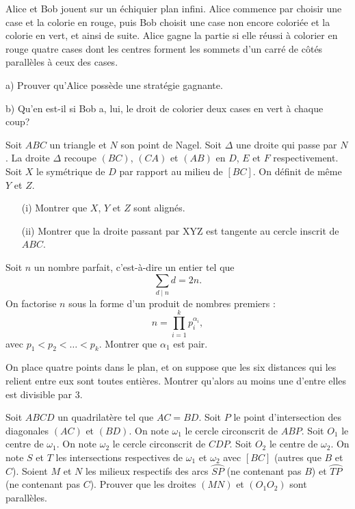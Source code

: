\begin{exo}{  }
Alice et Bob jouent sur un \'{e}chiquier plan infini. Alice commence par
choisir une case et la colorie en rouge, puis Bob choisit une case non
encore colori\'{e}e et la colorie en vert, et ainsi de suite. Alice gagne la
partie si elle r\'{e}ussi \`{a} colorier en rouge quatre cases  dont les
centres forment les sommets d'un carr\'{e} de c\^{o}t\'{e}s parall\`{e}les
\`{a} ceux des cases.

a) Prouver qu'Alice poss\`{e}de une strat\'{e}gie gagnante.

b) Qu'en est-il si Bob a, lui, le droit de colorier deux cases en vert \`{a}
chaque coup?
\end{exo}

\begin{exo}{}Soit $ABC$ un triangle et $N$ son point de Nagel. Soit $\Delta$ une droite qui passe par $N$. La droite $\Delta$ recoupe $(BC)$, $(CA)$ et $(AB)$ en $D$, $E$ et $F$ respectivement. Soit $X$ le symétrique de $D$ par rapport au milieu de $[BC]$. On définit de même $Y$ et $Z$. 
\begin{enumerate}
\item[(i)] Montrer que $X$, $Y$ et $Z$ sont alignés.
\item[(ii)] Montrer que la droite passant par XYZ est tangente au cercle inscrit de $ABC$.
\end{enumerate}
\end{exo}

\begin{exo}{}Soit $n$ un nombre parfait, c'est-à-dire un entier tel que $$\sum_{d
\mid n}d = 2n.$$
On factorise $n$ sous la forme d'un produit de nombres premiers : $$n =
\prod_{i=1}^k p_i^{\alpha_i},$$ avec $p_1 < p_2 < \ldots < p_k$.
Montrer que $\alpha_1$ est pair.
\end{exo}


\begin{exo}{}On place quatre points dans le plan, et on suppose que les six distances qui les relient entre eux sont toutes entières. Montrer qu'alors au moins une d'entre elles est divisible par 3.
\end{exo}

\begin{exo}{}
Soit $ABCD$ un quadrilatère tel que $AC=BD$. Soit $P$ le point d'intersection des diagonales $(AC)$ et $(BD)$. On note $\omega_{1}$ le cercle circonscrit de $ABP$. Soit $O_{1}$ le centre de $ \omega_{1}$. On note $ \omega_{2}$ le cercle circonscrit de $CDP$. Soit $O_{2}$ le centre de $ \omega_{2}$. On note $S$ et $T$ les intersections respectives de $ \omega_{1}$ et $ \omega_{2}$ avec $[BC]$ (autres que $B$ et $C$). Soient $M$ et $N$ les milieux respectifs des arcs $ \wideparen {SP}$ (ne contenant pas $B$) et $ \wideparen {TP}$ (ne contenant pas $C$). Prouver que les droites $(MN)$ et $(O_{1} O_{2})$ sont parallèles.
\end{exo}


